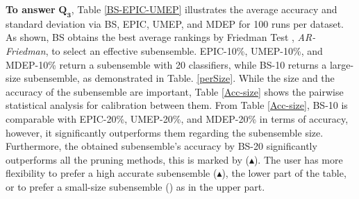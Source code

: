 \textbf{To answer} $\pmb{Q_3}$, Table \ref{BS-EPIC-UMEP} illustrates the average accuracy and standard deviation via BS, EPIC, UMEP, and MDEP for 100 runs per dataset. As shown, BS obtains the best average rankings by Friedman Test \cite{demsar2006}, \textit{AR-Friedman}, to select an effective subensemble. EPIC-10\%, UMEP-10\%, and MDEP-10\% return a subensemble with 20 classifiers, while BS-10 returns a large-size subensemble, as demonstrated in Table. \ref{perSize}. While the size and the accuracy of the subensemble are important, Table \ref{Acc-size} shows the pairwise statistical analysis \cite{wilcoxon1945} for calibration between them. From Table \ref{Acc-size}, BS-10 is comparable with EPIC-20\%, UMEP-20\%, and MDEP-20\% in terms of accuracy, however, it significantly outperforms them regarding the subensemble size. Furthermore, the obtained subensemble's accuracy by BS-20 significantly outperforms all the pruning methods, this is marked by ($\blacktriangle$). The user has more flexibility to prefer a high accurate subensemble ($\blacktriangle$), the lower part of the table, or to prefer a small-size subensemble (\textbullet) as in the upper part. 
\vspace*{.3cm}


